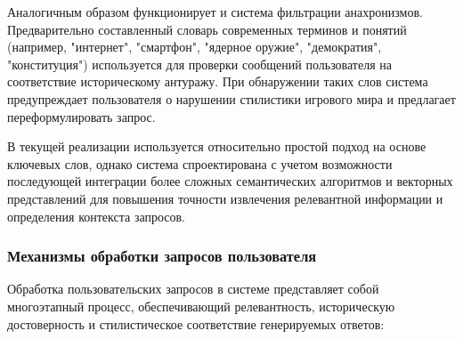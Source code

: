 Аналогичным образом функционирует и система фильтрации анахронизмов. Предварительно составленный словарь современных терминов и понятий (например, "{}интернет"{}, "{}смартфон"{}, "{}ядерное оружие"{}, "{}демократия"{}, "{}конституция"{}) используется для проверки сообщений пользователя на соответствие историческому антуражу. При обнаружении таких слов система предупреждает пользователя о нарушении стилистики игрового мира и предлагает переформулировать запрос.

В текущей реализации используется относительно простой подход на основе ключевых слов, однако система спроектирована с учетом возможности последующей интеграции более сложных семантических алгоритмов и векторных представлений для повышения точности извлечения релевантной информации и определения контекста запросов.

\subsubsection{Механизмы обработки запросов пользователя}

Обработка пользовательских запросов в системе представляет собой многоэтапный процесс, обеспечивающий релевантность, историческую достоверность и стилистическое соответствие генерируемых ответов:

